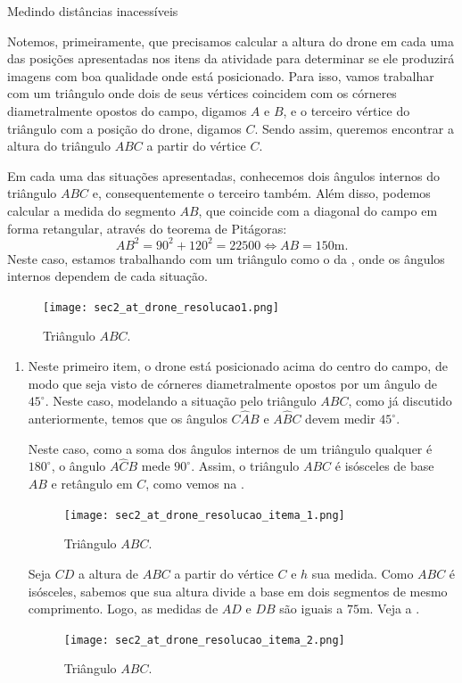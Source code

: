 \begin{answer}{Medindo distâncias inacessíveis}
{
Notemos, primeiramente, que precisamos calcular a altura do drone em cada uma das posições apresentadas nos itens da atividade para determinar se ele produzirá imagens com boa qualidade onde está posicionado. Para isso, vamos trabalhar com um triângulo onde dois de seus vértices coincidem com os córneres diametralmente opostos do campo, digamos $A$ e $B$, e o terceiro vértice do triângulo com a posição do drone, digamos $C$. Sendo assim, queremos encontrar a altura do triângulo $ABC$ a partir do vértice $C$. 

Em cada uma das situações apresentadas,  conhecemos dois ângulos internos do triângulo $ABC$ e, consequentemente o terceiro também. Além disso, podemos calcular a medida do segmento $AB$, que coincide com a diagonal do campo em forma retangular, através do teorema de Pitágoras:
$$AB^2=90^2+120^2=22500 \iff AB=150\text{m}.$$ 
Neste caso, estamos trabalhando com um triângulo como o da , onde os ângulos internos dependem de cada situação. 
\begin{figure}[H]
    \centering
    \texttt{[image: sec2\_at\_drone\_resolucao1.png]}
    \caption{Triângulo $ABC$.}
    \label{sec2_at_drone_resolucao1_fig}
\end{figure}

\begin{enumerate}
\item{}
Neste primeiro item, o drone está posicionado acima do centro do campo, de modo que seja visto de córneres diametralmente opostos por um ângulo de $45^\circ$. Neste caso, modelando a situação pelo triângulo $ABC$, como já discutido anteriormente, temos que os ângulos $C\hat{A}B$ e $A\hat{B}C$ devem medir $45^\circ$.

Neste caso, como a soma dos ângulos internos de um triângulo qualquer é $180^\circ$, o ângulo $A\hat{C}B$ mede $90^\circ$. Assim, o triângulo $ABC$ é isósceles de base $AB$ e retângulo em $C$, como vemos na .
\begin{figure}[H]
    \centering
    \texttt{[image: sec2\_at\_drone\_resolucao\_itema\_1.png]}
    \caption{Triângulo $ABC$.}
    \label{sec2_at_drone_resolucao_itema_1_fig}
\end{figure}

Seja $CD$ a altura de $ABC$ a partir do vértice $C$ e $h$ sua medida. Como $ABC$ é isósceles, sabemos que sua altura divide a base em dois segmentos de mesmo comprimento. Logo, as medidas de $AD$ e $DB$ são iguais a $75$m. Veja a .
\begin{figure}[H]
    \centering
    \texttt{[image: sec2\_at\_drone\_resolucao\_itema\_2.png]}
    \caption{Triângulo $ABC$.}
    \label{sec2_at_drone_resolucao_itema_2_fig}
\end{figure}


\end{enumerate}}
\end{answer}
